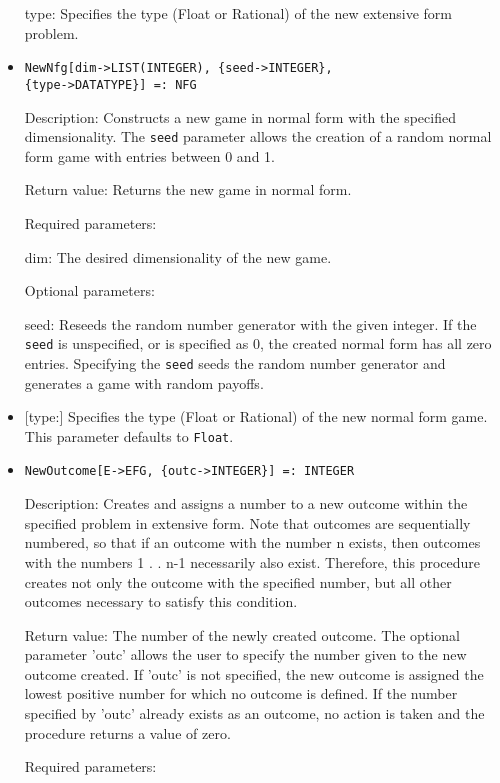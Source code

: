 \begin{itemize}
\bd
\item
[type:] Specifies the type (Float or Rational) of the new extensive
form problem.
\ed
\ed

\item

\protect \large \begin{verbatim}
NewNfg[dim->LIST(INTEGER), {seed->INTEGER},
{type->DATATYPE}] =: NFG
\end{verbatim}\normalsize

\bd
\item
[Description:] Constructs a new game in normal form with the
specified dimensionality.  The \verb+seed+ parameter allows the creation
of a random normal form game with entries between 0 and 1.

\item
[Return value:] Returns the new game in normal form.
\item
[Required parameters:]\hfil\null
	
\bd
\item
[dim:] The desired dimensionality of the new game.
\ed

\item
[Optional parameters:]\hfil\null
	
\bd
\item
[seed:] Reseeds the random number generator with the given integer.  If the
\verb+seed+ is unspecified, or is specified as 0, the created normal form
has all zero entries.  Specifying the \verb+seed+ seeds the random number
generator and generates a game with random payoffs.
\item

[type:] Specifies the type (Float or Rational) of the new normal form
game.  This parameter defaults to \verb+Float+.
\ed
\ed

\item
\protect \large \begin{verbatim}
NewOutcome[E->EFG, {outc->INTEGER}] =: INTEGER
\end{verbatim}\normalsize

\bd
\item
[Description:] Creates and assigns a number to a new outcome within
the specified problem in extensive form.  Note that outcomes are
sequentially numbered, so that if an outcome with the number n exists,
then outcomes with the numbers 1 . . n-1 necessarily also exist.
Therefore, this procedure creates not only the outcome with the
specified number, but all other outcomes necessary to satisfy this
condition.
\item
[Return value:] The number of the newly created outcome.  The optional
parameter 'outc' allows the user to specify the number given to the
new outcome created.  If 'outc' is not specified, the new outcome is
assigned the lowest positive number for which no outcome is defined.
If the number specified by 'outc' already exists as an outcome, no
action is taken and the procedure returns a value of zero.
\item
[Required parameters:]\hfil\null


\end{itemize}
